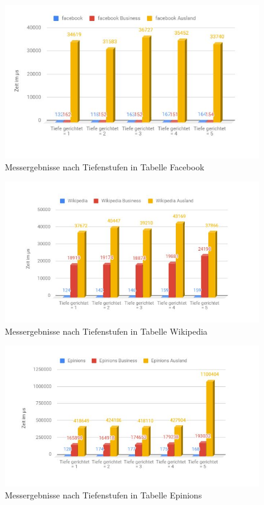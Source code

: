 \begin{figure}
	\centering
	\includegraphics[width=\textwidth]{images/face.jpg}
	\caption{Messergebnisse nach Tiefenstufen in Tabelle Facebook}
	\label{fig:face}
\end{figure}

\begin{figure}
\centering
\includegraphics[width=\textwidth]{images/wiki.jpg}
\caption{Messergebnisse nach Tiefenstufen in Tabelle Wikipedia}
\label{fig:wiki}
\end{figure}

\begin{figure}
	\centering
	\includegraphics[width=\textwidth]{images/epin.jpg}
	\caption{Messergebnisse nach Tiefenstufen in Tabelle Epinions}
	\label{fig:epin}
\end{figure}

